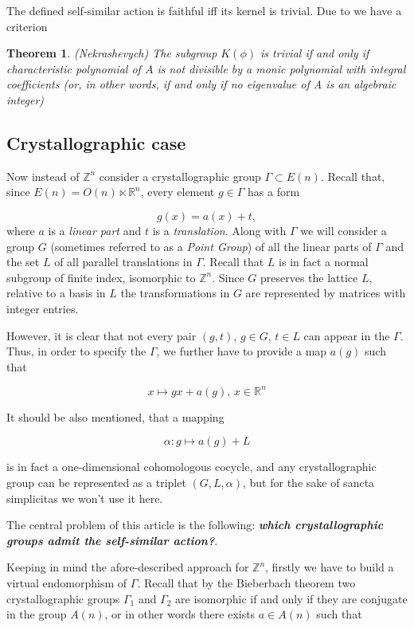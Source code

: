\documentclass[a4paper,12pt]{amsart}
\newtheorem{theorem}{Theorem}
\begin{document}
	The defined self-similar action is faithful iff its kernel is trivial. Due to \cite{Nekrashevych} we have a criterion
	
	\begin{theorem}(Nekrashevych) \label{theorem:Nekrashevych}
		The subgroup $K(\phi)$ is trivial if and only if characteristic polynomial
		of $A$ is not divisible by a monic polynomial with integral coefficients (or, in other words, if and only if no eigenvalue of A is an algebraic integer)
	\end{theorem}
	
	
	\subsection{Crystallographic case}
	
	Now instead of $\mathbb{Z}^n$ consider a crystallographic group $\Gamma \subset E(n)$. Recall that, since $E(n) = O(n) \ltimes \mathbb{R}^n$, every element $g \in \Gamma$ has a form 
	
	$$g(x) = a(x) + t,$$ 
	where $a$ is a \textit{linear part} and $t$ is a \textit{translation}. Along with $\Gamma$ we will consider a group $G$ (sometimes referred to as a \textit{Point Group}) of all the linear parts of $\Gamma$ and the set $L$ of all parallel translations in $\Gamma$. Recall that $L$ is in fact a normal subgroup of finite index, isomorphic to $\mathbb{Z}^n$. Since $G$ preserves the lattice $L$, relative to a basis in $L$ the transformations in $G$ are represented by matrices with integer entries. 
	
	However, it is clear that not every pair $(g, t), \, g \in G, \, t \in L$ can appear in the $\Gamma$. Thus, in order to specify the $\Gamma$, we further have to provide a map $a(g)$ such that 
	
	$$x \mapsto g x + a(g), \, x \in \mathbb{R}^n$$
	
	It should be also mentioned, that a mapping 
	
	$$\alpha : g \mapsto a(g) + L$$
	
	is in fact a one-dimensional cohomologous cocycle, and any crystallographic group can be represented as a triplet $(G, L, \alpha)$, but for the sake of sancta simplicitas we won't use it here. 
	
	The central problem of this article is the following: \textbf{\textit{which crystallographic groups admit the self-similar action?}}. 
	
	Keeping in mind the afore-described approach for $\mathbb{Z}^n$, firstly we have to build a virtual endomorphism of $\Gamma$. Recall that by the Bieberbach theorem two crystallographic groups $\Gamma_1$ and $\Gamma_2$ are isomorphic if and only if they are conjugate in the group $A(n)$, or in other words there exists $a \in A(n)$ such that 
	
\end{document}
